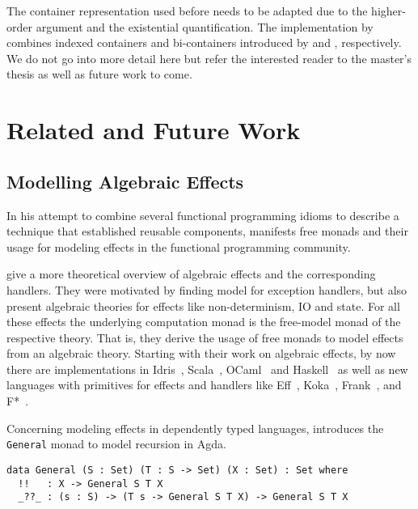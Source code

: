 The container representation used before needs to be adapted due to
the higher-order argument and the existential quantification.
The implementation by \citeauthor{bunkenburg2019modeling} combines
indexed containers and bi-containers introduced by
\citet{altenkirch2015indexed} and \citet{ghani2007higher}, respectively.
We do not go into more detail here but refer the interested reader to
the master's thesis as well as future work to come.

\section{Related and Future Work}

\subsection{Modelling Algebraic Effects}

In his attempt to combine several functional programming idioms to
describe a technique that established reusable components,
\citet{swierstra2008data} manifests free monads and their usage for
modeling effects in the functional programming community.

\citet{plotkin2009handlers} give a more theoretical overview of algebraic
effects and the corresponding handlers.
They were motivated by finding model for exception handlers, but also
present algebraic theories for effects like non-determinism, IO and
state.
For all these effects the underlying computation monad is the free-model
monad of the respective theory.
That is, they derive the usage of free monads to model effects from an
algebraic theory.
Starting with their work on algebraic effects, by now there are
implementations in Idris~\citep{brady2013programming},
Scala~\citep{brachthauser2017effekt}, OCaml~\citep{kiselyov2018eff}
and Haskell~\citep{kiselyov2015freer,kammar2013handlers} as well as
new languages with primitives for effects and handlers like
Eff~\citep{pretnar2015introduction}, Koka~\citep{leijen2016algebraic},
Frank~\citep{lindley2017be}, and F*~\citep{swamy2016dependent}.

Concerning modeling effects in dependently typed languages,
\cite{mcbride2015turingcompleteness} introduces the \texttt{General}
monad to model recursion in Agda.

\begin{verbatim}
data General (S : Set) (T : S -> Set) (X : Set) : Set where
  !!   : X -> General S T X
  _??_ : (s : S) -> (T s -> General S T X) -> General S T X
\end{verbatim}

